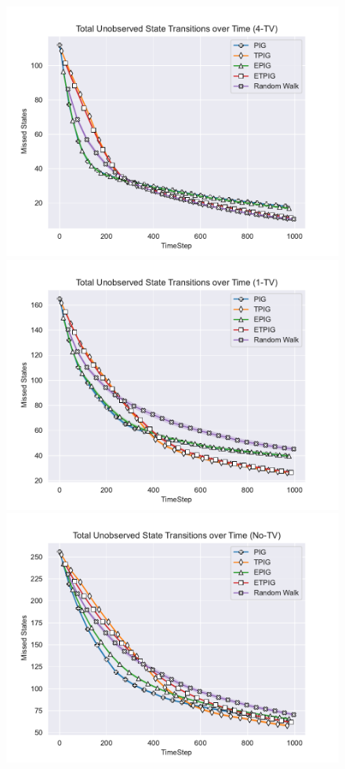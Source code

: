\documentclass[12pt]{thesis}
\begin{document}
\begin{figure}
	\begin{center}
		\includegraphics[scale=0.46]{"images/Missed_States_4-TV.pdf"}
		\includegraphics[scale=0.46]{"images/Missed_States_1-TV.pdf"}
		\includegraphics[scale=0.46]{"images/Missed_States_No-TV.pdf"}

\end{center}
\end{figure}
\end{document}
